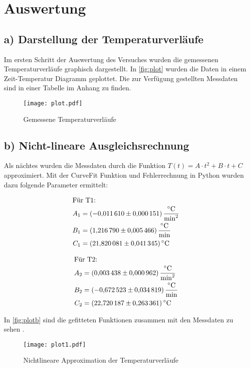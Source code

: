 \section{Auswertung}
\label{sec:Auswertung}
\subsection*{a) Darstellung der Temperaturverläufe}
Im ersten Schritt der Auswertung des Versuches wurden die gemessenen Temperaturverläufe graphisch dargestellt.
In \autoref{fig:plot} 
wurden die Daten in einem Zeit-Temperatur Diagramm geplottet. Die zur Verfügung gestellten Messdaten sind in einer Tabelle 
im Anhang zu finden.

\begin{figure}
  \centering
  \texttt{[image: plot.pdf]}
  \caption{Gemessene Temperaturverläufe}
  \label{fig:plot}
\end{figure}
\newpage
\subsection*{b) Nicht-lineare Ausgleichsrechnung}
Als nächtes wurden die Messdaten durch die Funktion $T(t)=A\cdot t^2+B\cdot t+C$ approximiert.
Mit der CurveFit Funktion und Fehlerrechnung in Python wurden dazu folgende Parameter ermittelt: 

\begin{align*}
  \intertext{Für T1:}
  A_1 &= \SI{-0.011610+-0.000151}{\celsius\per\minute\squared}\\
  B_1 &= \SI{1.216790 +- 0.005466}{\celsius\per\minute}\\
  C_1 &= \SI{21.820081 +- 0.041345}{\celsius}
\end{align*}
  
\begin{align*}  
  \intertext{Für T2:}
  A_2 &= \SI{0.003438 +- 0.000962}{\celsius\per\minute\squared}\\
  B_2 &= \SI{-0.672523 +- 0.034819}{\celsius\per\minute}\\
  C_2 &= \SI{22.720187 +- 0.263361}{\celsius}
\end{align*} 

In \autoref{fig:plotb} 
sind die gefitteten Funktionen zusammen mit den Messdaten zu sehen . 

\begin{figure}
  \centering
  \texttt{[image: plot1.pdf]}
  \caption{Nichtlineare Approximation der Temperaturverläufe}
  \label{fig:plotb}
\end{figure}

